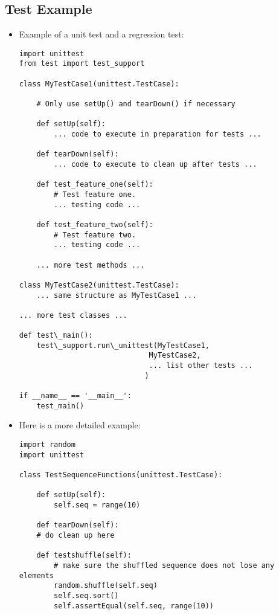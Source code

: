 \subsection{Test Example}
\begin{itemize}

  \item
    Example of a unit test and a regression test:

    \begin{verbatim}import unittest
from test import test_support

class MyTestCase1(unittest.TestCase):

    # Only use setUp() and tearDown() if necessary

    def setUp(self):
        ... code to execute in preparation for tests ...

    def tearDown(self):
        ... code to execute to clean up after tests ...

    def test_feature_one(self):
        # Test feature one.
        ... testing code ...

    def test_feature_two(self):
        # Test feature two.
        ... testing code ...

    ... more test methods ...

class MyTestCase2(unittest.TestCase):
    ... same structure as MyTestCase1 ...

... more test classes ...

def test\_main():
    test\_support.run\_unittest(MyTestCase1,
                              MyTestCase2,
                              ... list other tests ...
                             )

if __name__ == '__main__':
    test_main()
    \end{verbatim}
    \normalcolor

  \item Here is a more detailed example:    

    \begin{verbatim}import random
import unittest

class TestSequenceFunctions(unittest.TestCase):
    
    def setUp(self):
        self.seq = range(10)

    def tearDown(self):
	# do clean up here

    def testshuffle(self):
        # make sure the shuffled sequence does not lose any elements
        random.shuffle(self.seq)
        self.seq.sort()
        self.assertEqual(self.seq, range(10))


\end{verbatim}
\end{itemize}
